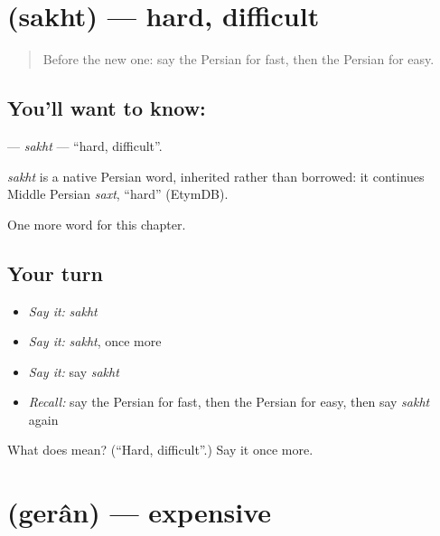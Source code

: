 \section[\texorpdfstring{\fa{سخت} (sakht)}{سخت (sakht)}]{ (sakht) — hard, difficult}

\label{lesson:FA-C60-sakht}



\begin{quote}
Before the new one: say the Persian for fast, then the Persian for easy.
\end{quote}

\subsection*{You'll want to know: }
\textbf{} — \emph{sakht} — \textquotedblleft{}hard, difficult\textquotedblright{}.

\begin{cousinweb}
\emph{sakht} is a native Persian word, inherited rather than borrowed: it continues Middle Persian \emph{saxt}, \textquotedblleft{}hard\textquotedblright{} (EtymDB).
\end{cousinweb}

\begin{grammarlens}[title={What you've built}]
One more word for this chapter.
\end{grammarlens}

\subsection*{Your turn}
\begin{itemize}
\raggedright
  \item \emph{Say it:} \emph{sakht}
  \item \emph{Say it:} \emph{sakht}, once more
  \item \emph{Say it:} say \emph{sakht}
  \item \emph{Recall:} say the Persian for fast, then the Persian for easy, then say \emph{sakht} again
\end{itemize}

\begin{tcolorbox}[breakable,colback=teal!4,colframe=teal!35!black,title={Before you move on}]
What does  mean? (\textquotedblleft{}Hard, difficult\textquotedblright{}.) Say it once more.
\end{tcolorbox}
\section[\texorpdfstring{\fa{گران} (gerân)}{گران (gerân)}]{ (gerân) — expensive}

